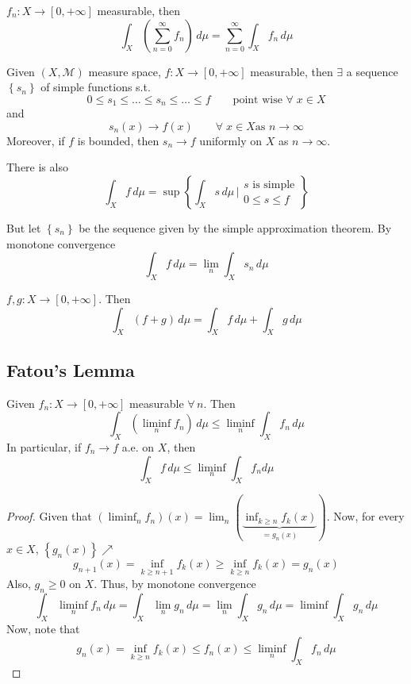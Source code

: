 \begin{corollary}
    \(f_n : X \to [0, +\infty]\) measurable, then 
    \[
        \int_X \left( \sum_{n=0}^{\infty} f_n\right) \, d\mu = \sum_{n=0}^{\infty} \int_X f_n \, d\mu
    \]
\end{corollary}

\begin{theorem}
    Given \((X, \mathcal{M})\) measure space, \(f: X \to [0, +\infty]\) measurable, then \(\exists\) a sequence \(\left\{ s_n \right\}\) of simple functions s.t. 
    \[
        0 \leq s_1 \leq \ldots \leq s_n \leq \ldots \leq f \qquad \text{point wise } \forall \; x \in X
    \]
    and 
    \[
        s_n (x) \to f(x) \qquad \forall \; x \in X \text{as } n \to \infty 
    \]
    Moreover, if \(f\) is bounded, then \(s_n \to f\) uniformly on \(X\) as \(n \to \infty\).
\end{theorem}

\begin{remark}
    There is also
    \[
        \int_X f \, d\mu = \sup \left\{ \int_X s \, d\mu \, \bigg\vert \begin{array}{l}s\text{ is simple} \\ 0 \leq s \leq f \end{array}\right\}
    \]
\end{remark}

But let \(\left\{ s_n \right\}\) be the sequence given by the simple approximation theorem. By monotone convergence 
\[
    \int_X f \, d\mu = \lim_n \int_X s_n \, d\mu
\]
\begin{example}
    \(f, g : X \to [0, +\infty]\). Then 
    \[
        \int_X (f+g) \, d\mu = \int_X f \, d\mu + \int_X g \, d\mu
    \]
\end{example}
\subsection{Fatou's Lemma}
\begin{lemma}
    Given \(f_n: X \to [0, +\infty]\) measurable \(\forall \, n\). Then 
    \[
        \int_X (\liminf_n f_n) \, d\mu \leq \liminf_n \int_X f_n \, d\mu
    \]
    In particular, if \(f_n \to f\) a.e. on \(X\), then
    \[
        \int_X f \, d\mu \leq \liminf_n \int_X f_n d\mu
    \]
\end{lemma}

\begin{proof}
    Given that \((\liminf_n f_n)(x) = \lim_n (\underbrace{\inf_{k \geq n} f_k(x)}_{= g_n (x)})\). Now, for every \(x \in X\), \(\left\{ g_n(x) \right\}\nearrow\)
    \[
        g_{n+1}(x) = \inf_{k \geq n+1} f_k(x) \geq \inf_{k \geq n} f_k(x) = g_n (x)
    \]
    Also, \(g_n \geq 0\) on \(X\). Thus, by monotone convergence
    \[
        \int_X \liminf_n f_n \, d\mu = \int_X \lim_n g_n \, d\mu = \lim_n \int_X g_n \, d\mu = \liminf \int_X g_n \, d\mu
    \]
    Now, note that \[g_n (x) = \inf_{k\geq n} f_k(x) \leq f_n(x) \leq \liminf_n \int_X f_n \, d\mu\]
\end{proof}
